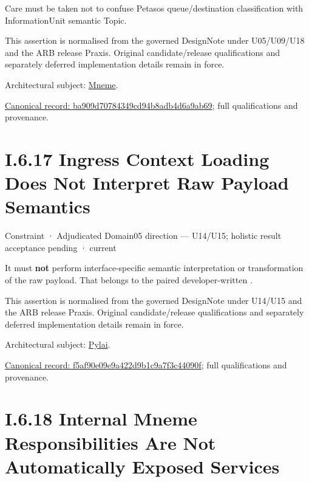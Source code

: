 Care must be taken not to confuse Petasos queue/destination classification with InformationUnit semantic Topic.



This assertion is normalised from the governed DesignNote under U05/U09/U18 and the ARB release Praxis. Original candidate/release qualifications and separately deferred implementation details remain in force.



Architectural subject: \hyperref[element:1af8a56358f7429fabfb57be66542a99]{Mneme}.


{\footnotesize \href{../../../../../../../continuum/motivation/constraint/ba909d70784349cd94b8adb4d6a9ab69.md}{Canonical record: ba909d70784349cd94b8adb4d6a9ab69}; full qualifications and provenance.}\par
\section*{I.6.17 Ingress Context Loading Does Not Interpret Raw Payload Semantics}
\label{navigation:I.6.17}

\label{element:f5af90e09e9a422d9b1c9a7f3c44090f}
{\small Constraint · Adjudicated Domain05 direction — U14/U15; holistic result acceptance pending · current}\par

It must \textbf{not} perform interface-specific semantic interpretation or transformation of the raw payload. That belongs to the paired developer-written \texttt{}.



This assertion is normalised from the governed DesignNote under U14/U15 and the ARB release Praxis. Original candidate/release qualifications and separately deferred implementation details remain in force.



Architectural subject: \hyperref[element:e3e4147fea3640198dc251ed41ee854d]{Pylai}.


{\footnotesize \href{../../../../../../../continuum/motivation/constraint/f5af90e09e9a422d9b1c9a7f3c44090f.md}{Canonical record: f5af90e09e9a422d9b1c9a7f3c44090f}; full qualifications and provenance.}\par
\section*{I.6.18 Internal Mneme Responsibilities Are Not Automatically Exposed Services}
\label{navigation:I.6.18}

